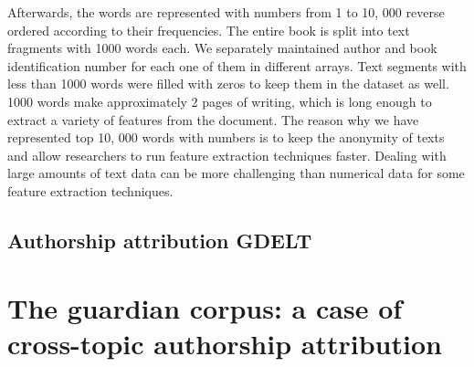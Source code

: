 Afterwards, the words are represented with numbers from 1 to 10, 000 reverse ordered according to their frequencies. The entire book is split into text fragments with 1000 words each. We separately maintained author and book identification number for each one of them in different arrays. Text segments with less than 1000 words were filled with zeros to keep them in the dataset as well.
1000 words make approximately 2 pages of writing, which is long enough to extract a variety of features from the document. The reason why we have represented top 10, 000 words with numbers is to keep the anonymity of texts and allow researchers to run feature extraction techniques faster. Dealing with large amounts of text data can be more challenging than numerical data for some feature extraction techniques.
\subsection{Authorship attribution GDELT}

\section{The guardian corpus: a case of cross-topic authorship attribution}

